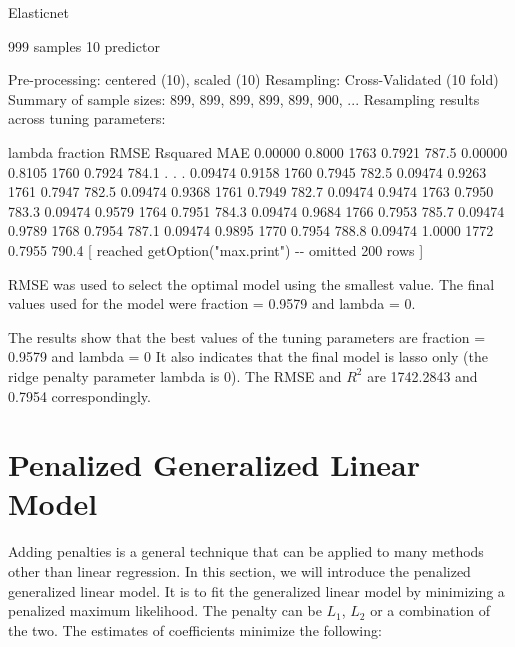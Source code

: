 \documentclass[
  12pt,
]{krantz}
\makeatletter
\newenvironment{Shaded}{\begin{snugshade}}{\end{snugshade}}
\newcommand{\NormalTok}[1]{#1}
\newenvironment{kframe}{%
\medskip{}
\setlength{\fboxsep}{.8em}
 \def\at@end@of@kframe{}%
 \ifinner\ifhmode%
  \def\at@end@of@kframe{\end{minipage}}%
  \begin{minipage}{\columnwidth}%
 \fi\fi%
 \def\FrameCommand##1{\hskip\@totalleftmargin \hskip-\fboxsep
 \colorbox{shadecolor}{##1}\hskip-\fboxsep
     \hskip-\linewidth \hskip-\@totalleftmargin \hskip\columnwidth}%
 \MakeFramed {\advance\hsize-\width
   \@totalleftmargin\z@ \linewidth\hsize
   \@setminipage}}%
 {\par\unskip\endMakeFramed%
 \at@end@of@kframe}
\renewenvironment{Shaded}{\begin{kframe}}{\end{kframe}}
\makeatother
\begin{document}
\begin{Shaded}
\begin{Highlighting}[]
\NormalTok{Elasticnet }

\NormalTok{999 samples}
\NormalTok{ 10 predictor}

\NormalTok{Pre{-}processing: centered (10), scaled (10) }
\NormalTok{Resampling: Cross{-}Validated (10 fold) }
\NormalTok{Summary of sample sizes: 899, 899, 899, 899, 899, 900, ... }
\NormalTok{Resampling results across tuning parameters:}

\NormalTok{  lambda   fraction  RMSE  Rsquared  MAE  }
\NormalTok{  0.00000  0.8000    1763  0.7921    787.5}
\NormalTok{  0.00000  0.8105    1760  0.7924    784.1}
\NormalTok{  .}
\NormalTok{  .}
\NormalTok{  .}
\NormalTok{  0.09474  0.9158    1760  0.7945    782.5}
\NormalTok{  0.09474  0.9263    1761  0.7947    782.5}
\NormalTok{  0.09474  0.9368    1761  0.7949    782.7}
\NormalTok{  0.09474  0.9474    1763  0.7950    783.3}
\NormalTok{  0.09474  0.9579    1764  0.7951    784.3}
\NormalTok{  0.09474  0.9684    1766  0.7953    785.7}
\NormalTok{  0.09474  0.9789    1768  0.7954    787.1}
\NormalTok{  0.09474  0.9895    1770  0.7954    788.8}
\NormalTok{  0.09474  1.0000    1772  0.7955    790.4}
\NormalTok{ [ reached getOption("max.print") {-}{-} omitted 200 rows ]}

\NormalTok{RMSE was used to select the optimal model using the smallest value.}
\NormalTok{The final values used for the model were fraction = 0.9579 and lambda = 0.}
\end{Highlighting}
\end{Shaded}

The results show that the best values of the tuning parameters are fraction = 0.9579 and lambda = 0 It also indicates that the final model is lasso only (the ridge penalty parameter lambda is 0). The RMSE and \(R^{2}\) are 1742.2843 and 0.7954 correspondingly.

\hypertarget{penalized-generalized-linear-model}{%
\section{Penalized Generalized Linear Model}\label{penalized-generalized-linear-model}}

Adding penalties is a general technique that can be applied to many methods other than linear regression. In this section, we will introduce the penalized generalized linear model. It is to fit the generalized linear model by minimizing a penalized maximum likelihood. The penalty can be \(L_1\), \(L_2\) or a combination of the two. The estimates of coefficients minimize the following:
\end{document}
